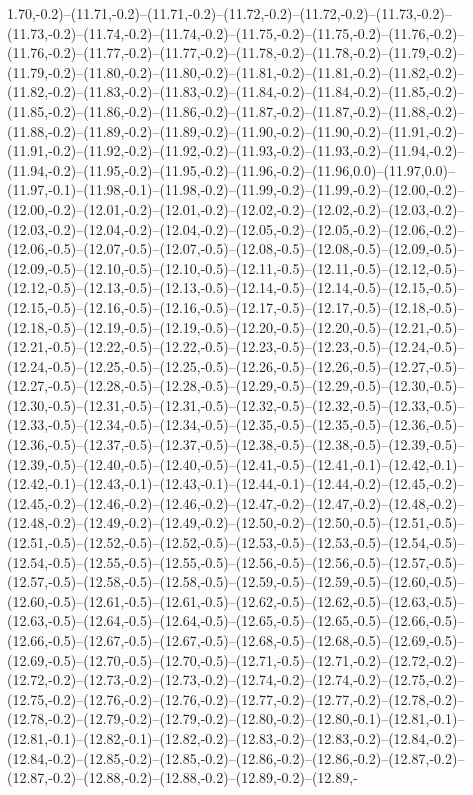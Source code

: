1.70,-0.2)--(11.71,-0.2)--(11.71,-0.2)--(11.72,-0.2)--(11.72,-0.2)--(11.73,-0.2)--(11.73,-0.2)--(11.74,-0.2)--(11.74,-0.2)--(11.75,-0.2)--(11.75,-0.2)--(11.76,-0.2)--(11.76,-0.2)--(11.77,-0.2)--(11.77,-0.2)--(11.78,-0.2)--(11.78,-0.2)--(11.79,-0.2)--(11.79,-0.2)--(11.80,-0.2)--(11.80,-0.2)--(11.81,-0.2)--(11.81,-0.2)--(11.82,-0.2)--(11.82,-0.2)--(11.83,-0.2)--(11.83,-0.2)--(11.84,-0.2)--(11.84,-0.2)--(11.85,-0.2)--(11.85,-0.2)--(11.86,-0.2)--(11.86,-0.2)--(11.87,-0.2)--(11.87,-0.2)--(11.88,-0.2)--(11.88,-0.2)--(11.89,-0.2)--(11.89,-0.2)--(11.90,-0.2)--(11.90,-0.2)--(11.91,-0.2)--(11.91,-0.2)--(11.92,-0.2)--(11.92,-0.2)--(11.93,-0.2)--(11.93,-0.2)--(11.94,-0.2)--(11.94,-0.2)--(11.95,-0.2)--(11.95,-0.2)--(11.96,-0.2)--(11.96,0.0)--(11.97,0.0)--(11.97,-0.1)--(11.98,-0.1)--(11.98,-0.2)--(11.99,-0.2)--(11.99,-0.2)--(12.00,-0.2)--(12.00,-0.2)--(12.01,-0.2)--(12.01,-0.2)--(12.02,-0.2)--(12.02,-0.2)--(12.03,-0.2)--(12.03,-0.2)--(12.04,-0.2)--(12.04,-0.2)--(12.05,-0.2)--(12.05,-0.2)--(12.06,-0.2)--(12.06,-0.5)--(12.07,-0.5)--(12.07,-0.5)--(12.08,-0.5)--(12.08,-0.5)--(12.09,-0.5)--(12.09,-0.5)--(12.10,-0.5)--(12.10,-0.5)--(12.11,-0.5)--(12.11,-0.5)--(12.12,-0.5)--(12.12,-0.5)--(12.13,-0.5)--(12.13,-0.5)--(12.14,-0.5)--(12.14,-0.5)--(12.15,-0.5)--(12.15,-0.5)--(12.16,-0.5)--(12.16,-0.5)--(12.17,-0.5)--(12.17,-0.5)--(12.18,-0.5)--(12.18,-0.5)--(12.19,-0.5)--(12.19,-0.5)--(12.20,-0.5)--(12.20,-0.5)--(12.21,-0.5)--(12.21,-0.5)--(12.22,-0.5)--(12.22,-0.5)--(12.23,-0.5)--(12.23,-0.5)--(12.24,-0.5)--(12.24,-0.5)--(12.25,-0.5)--(12.25,-0.5)--(12.26,-0.5)--(12.26,-0.5)--(12.27,-0.5)--(12.27,-0.5)--(12.28,-0.5)--(12.28,-0.5)--(12.29,-0.5)--(12.29,-0.5)--(12.30,-0.5)--(12.30,-0.5)--(12.31,-0.5)--(12.31,-0.5)--(12.32,-0.5)--(12.32,-0.5)--(12.33,-0.5)--(12.33,-0.5)--(12.34,-0.5)--(12.34,-0.5)--(12.35,-0.5)--(12.35,-0.5)--(12.36,-0.5)--(12.36,-0.5)--(12.37,-0.5)--(12.37,-0.5)--(12.38,-0.5)--(12.38,-0.5)--(12.39,-0.5)--(12.39,-0.5)--(12.40,-0.5)--(12.40,-0.5)--(12.41,-0.5)--(12.41,-0.1)--(12.42,-0.1)--(12.42,-0.1)--(12.43,-0.1)--(12.43,-0.1)--(12.44,-0.1)--(12.44,-0.2)--(12.45,-0.2)--(12.45,-0.2)--(12.46,-0.2)--(12.46,-0.2)--(12.47,-0.2)--(12.47,-0.2)--(12.48,-0.2)--(12.48,-0.2)--(12.49,-0.2)--(12.49,-0.2)--(12.50,-0.2)--(12.50,-0.5)--(12.51,-0.5)--(12.51,-0.5)--(12.52,-0.5)--(12.52,-0.5)--(12.53,-0.5)--(12.53,-0.5)--(12.54,-0.5)--(12.54,-0.5)--(12.55,-0.5)--(12.55,-0.5)--(12.56,-0.5)--(12.56,-0.5)--(12.57,-0.5)--(12.57,-0.5)--(12.58,-0.5)--(12.58,-0.5)--(12.59,-0.5)--(12.59,-0.5)--(12.60,-0.5)--(12.60,-0.5)--(12.61,-0.5)--(12.61,-0.5)--(12.62,-0.5)--(12.62,-0.5)--(12.63,-0.5)--(12.63,-0.5)--(12.64,-0.5)--(12.64,-0.5)--(12.65,-0.5)--(12.65,-0.5)--(12.66,-0.5)--(12.66,-0.5)--(12.67,-0.5)--(12.67,-0.5)--(12.68,-0.5)--(12.68,-0.5)--(12.69,-0.5)--(12.69,-0.5)--(12.70,-0.5)--(12.70,-0.5)--(12.71,-0.5)--(12.71,-0.2)--(12.72,-0.2)--(12.72,-0.2)--(12.73,-0.2)--(12.73,-0.2)--(12.74,-0.2)--(12.74,-0.2)--(12.75,-0.2)--(12.75,-0.2)--(12.76,-0.2)--(12.76,-0.2)--(12.77,-0.2)--(12.77,-0.2)--(12.78,-0.2)--(12.78,-0.2)--(12.79,-0.2)--(12.79,-0.2)--(12.80,-0.2)--(12.80,-0.1)--(12.81,-0.1)--(12.81,-0.1)--(12.82,-0.1)--(12.82,-0.2)--(12.83,-0.2)--(12.83,-0.2)--(12.84,-0.2)--(12.84,-0.2)--(12.85,-0.2)--(12.85,-0.2)--(12.86,-0.2)--(12.86,-0.2)--(12.87,-0.2)--(12.87,-0.2)--(12.88,-0.2)--(12.88,-0.2)--(12.89,-0.2)--(12.89,-